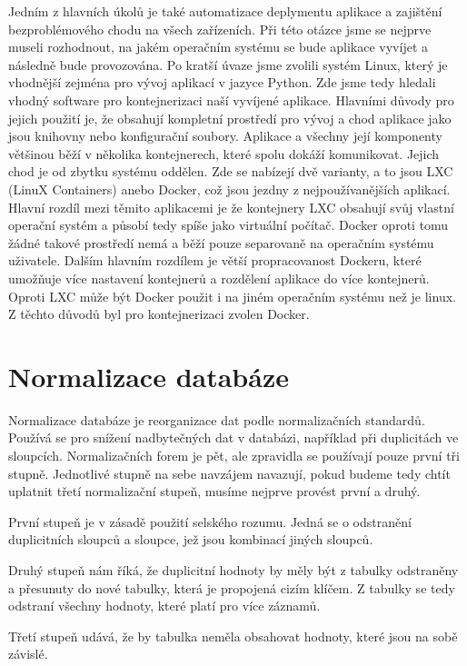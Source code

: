 Jedním z hlavních úkolů je také automatizace deplymentu aplikace a
zajištění bezproblémového chodu na všech zařízeních. Při této otázce
jsme se nejprve museli rozhodnout, na jakém operačním systému se bude
aplikace vyvíjet a následně bude provozována. Po kratší úvaze jsme
zvolili systém Linux, který je vhodnější zejména pro vývoj aplikací v
jazyce Python. Zde jsme tedy hledali vhodný software pro
kontejnerizaci naší vyvíjené aplikace. Hlavními důvody pro jejich
použití je, že obsahují kompletní prostředí pro vývoj a chod aplikace
jako jsou knihovny nebo konfigurační soubory. Aplikace a všechny její
komponenty většinou běží v několika kontejnerech, které spolu dokáží
komunikovat. Jejich chod je od zbytku systému oddělen. Zde se nabízejí
dvě varianty, a to jsou LXC (LinuX Containers) anebo Docker, což jsou
jezdny z nejpoužívanějších aplikací. Hlavní rozdíl mezi těmito
aplikacemi je že kontejnery LXC obsahují svůj vlastní operační systém
a působí tedy spíše jako virtuální počítač. Docker oproti tomu žádné
takové prostředí nemá a běží pouze separovaně na operačním systému
uživatele. Dalším hlavním rozdílem je větší propracovanost Dockeru,
které umožňuje více nastavení kontejnerů a rozdělení aplikace do více
kontejnerů. Oproti LXC může být Docker použit i na
jiném operačním systému než je linux. Z těchto důvodů byl pro
kontejnerizaci zvolen Docker. \cite{deployment}

\newpage

\section{Normalizace databáze}

Normalizace databáze je reorganizace dat podle normalizačních standardů. 
Používá se pro snížení nadbytečných dat v databázi, například při duplicitách 
ve sloupcích. Normalizačních forem je pět, ale zpravidla se používají pouze 
první tři stupně. Jednotlivé stupně na sebe navzájem navazují, pokud budeme 
tedy chtít uplatnit třetí normalizační stupeň, musíme nejprve provést první a druhý.

První stupeň je v zásadě použití selského rozumu. Jedná se o odstranění 
duplicitních sloupců a sloupce, jež jsou kombinací jiných sloupců.

Druhý stupeň nám říká, že duplicitní hodnoty by měly být z tabulky odstraněny 
a přesunuty do nové tabulky, která je propojená cizím klíčem. Z tabulky se tedy 
odstraní všechny hodnoty, které platí pro více záznamů.

Třetí stupeň udává, že by tabulka neměla obsahovat hodnoty, které jsou na sobě závislé. 

